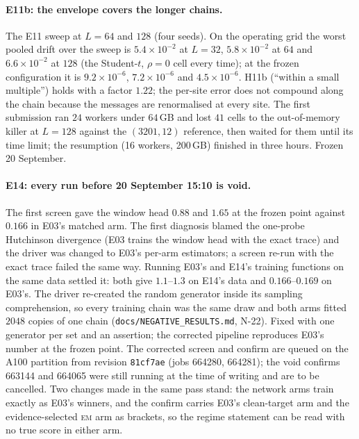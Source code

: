 \paragraph{E11b: the envelope covers the longer chains.} The E11 sweep at $L=64$ and $128$ (four seeds). On the operating grid the worst pooled drift over the sweep is $5.4\times10^{-2}$ at $L=32$, $5.8\times10^{-2}$ at $64$ and $6.6\times10^{-2}$ at $128$ (the Student-$t$, $\rho=0$ cell every time); at the frozen configuration it is $9.2\times10^{-6}$, $7.2\times10^{-6}$ and $4.5\times10^{-6}$. H11b (``within a small multiple'') holds with a factor $1.22$; the per-site error does not compound along the chain because the messages are renormalised at every site. The first submission ran $24$ workers under $64$\,GB and lost $41$ cells to the out-of-memory killer at $L=128$ against the $(3201,12)$ reference, then waited for them until its time limit; the resumption (16 workers, 200\,GB) finished in three hours. Frozen 20 September.

\paragraph{E14: every run before 20 September 15:10 is void.} The first screen gave the window head $0.88$ and $1.65$ at the frozen point against $0.166$ in E03's matched arm. The first diagnosis blamed the one-probe Hutchinson divergence (E03 trains the window head with the exact trace) and the driver was changed to E03's per-arm estimators; a screen re-run with the exact trace failed the same way. Running E03's and E14's training functions on the same data settled it: both give $1.1$--$1.3$ on E14's data and $0.166$--$0.169$ on E03's. The driver re-created the random generator inside its sampling comprehension, so every training chain was the same draw and both arms fitted $2048$ copies of one chain (\texttt{docs/NEGATIVE\_RESULTS.md}, N-22). Fixed with one generator per set and an assertion; the corrected pipeline reproduces E03's number at the frozen point. The corrected screen and confirm are queued on the A100 partition from revision \texttt{81cf7ae} (jobs 664280, 664281); the void confirms 663144 and 664065 were still running at the time of writing and are to be cancelled. Two changes made in the same pass stand: the network arms train exactly as E03's winners, and the confirm carries E03's clean-target arm and the evidence-selected \textsc{em} arm as brackets, so the regime statement can be read with no true score in either arm.

